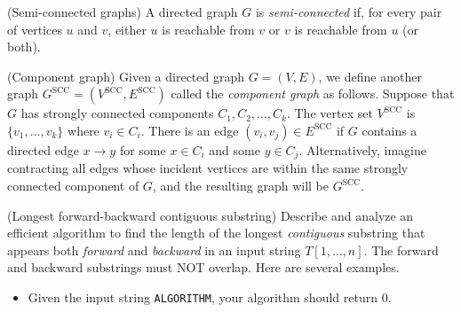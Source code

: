 \begin{questions}

\question (Semi-connected graphs) A directed graph $G$ is
  \emph{semi-connected} if, for every pair of vertices $u$ and $v$,
  either $u$ is reachable from $v$ or $v$ is reachable from $u$ (or
  both).

  \newpage
\def\scc{\text{SCC}}  
\question (Component graph) Given a directed graph $G=(V,E)$, we
  define another graph $G^{\scc} =(V^\scc, E^\scc)$ called the
  \emph{component graph} as follows. Suppose that $G$ has strongly
  connected components $C_1, C_2, \ldots, C_k$. The vertex set
  $V^\scc$ is $\{v_1,\ldots,v_k\}$ where $v_i\in C_i$. There is an
  edge $ (v_i,v_j) \in E^\scc$ if $G$ contains a directed edge
  $x\to y$ for some $x\in C_i$ and some $y\in C_j$. Alternatively,
  imagine contracting all edges whose incident vertices are within the
  same strongly connected component of $G$, and the resulting graph
  will be $G^\scc$.

\newpage  
  \question[20] (Longest forward-backward contiguous substring) Describe
  and analyze an efficient algorithm to find the length of the longest
  \emph{contiguous} substring that appears both \emph{forward} and
  \emph{backward} in an input string $T[1,\ldots,n]$. The forward and
  backward substrings must NOT overlap.  Here are several examples.
  \begin{itemize}
  \item Given the input string \texttt{ALGORITHM}, your algorithm
    should return 0.


\end{itemize}
\end{questions}
